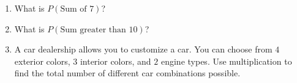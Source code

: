\documentclass[12pt, letterpaper, fleqn]{article}
\newcommand{\blank}{\underline{\hspace{2.2cm}}}
\begin{document}
\vspace{3mm}

\begin{enumerate}[itemsep=2.5cm, leftmargin=0.6cm, resume]
\item What is $P(\text{Sum of 7})$? \blank
\item What is $P(\text{Sum greater than 10})$? \blank
\item A car dealership allows you to customize a car. You can choose from $4$ exterior colors, $3$ interior colors, and $2$ engine types. Use multiplication to find the total number of different car combinations possible.
\end{enumerate}
\end{document}
